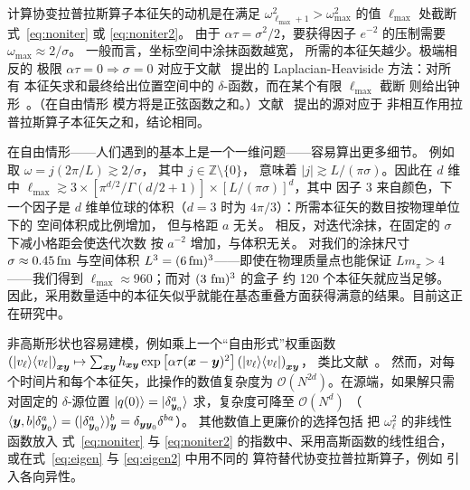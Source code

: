 计算协变拉普拉斯算子本征矢的动机是在满足 $\omega_{\ell_{\max}+1}^2>\omega_{\max}^2$ 的值 $\ell_{\max}$ 处截断
式~\eqref{eq:noniter} 或 \eqref{eq:noniter2}。
由于 $\alpha\tau=\sigma^2/2$，要获得因子 $e^{-2}$ 的压制需要
$\omega_{\max}\approx 2/\sigma$。
一般而言，坐标空间中涂抹函数越宽，
所需的本征矢越少。极端相反的
极限 $\alpha\tau=0\Rightarrow\sigma=0$ 对应于文献~\cite{Peardon:2009gh} 提出的
Laplacian-Heaviside 方法：对所有
本征矢求和最终给出位置空间中的 $\delta$-函数，而在某个有限 $\ell_{\max}$ 截断
则给出钟形~\cite{Peardon:2009gh}。（在自由情形
模方将是正弦函数之和。）文献~\cite{Brown:2012tm} 提出的源对应于
非相互作用拉普拉斯算子本征矢之和，结论相同。

在自由情形——人们遇到的基本上是一个一维问题——容易算出更多细节。
例如取 $\omega= j (2\pi/L)\gtrsim 2/\sigma$，
其中 $j\in\mathbb{Z}\setminus\{0\}$，
意味着
$|j|\gtrsim L/(\pi\sigma)$。因此在 $d$ 维中
$\ell_{\max}\gtrsim 3\times[\pi^{d/2}/\Gamma(d/2+1)]\times[L/(\pi\sigma)]^d$，其中
因子 $3$ 来自颜色，下一个因子是
$d$ 维单位球的体积（$d=3$ 时为 $4\pi/3$）：所需本征矢的数目按物理单位下的
空间体积成比例增加，
但与格距 $a$ 无关。
相反，对迭代涂抹，在固定的 $\sigma$ 下减小格距会使迭代次数
按 $a^{-2}$ 增加，与体积无关。
对我们的涂抹尺寸 $\sigma\approx0.45\,\textmd{fm}$ 与空间体积
$L^3=(6\,\textmd{fm})^3$——即使在物理质量点也能保证 $Lm_{\pi}>4$——我们得到
$\ell_{\max}\approx 960$；而对 $(3\,\,\textmd{fm})^3$ 的盒子
约 120 个本征矢就应当足够。
因此，采用数量适中的本征矢似乎就能在基态重叠方面获得满意的结果。目前这正在研究中。

非高斯形状也容易建模，例如乘上一个``自由形式''权重函数
$\left(|v_{\ell}\rangle\langle v_{\ell}|\right)_{\boldsymbol{x}\boldsymbol{y}}
\mapsto \sum_{\boldsymbol{xy}}h_{\boldsymbol{x}\boldsymbol{y}}\exp\left[\alpha\tau(\boldsymbol{x}-\boldsymbol{y})^2\right]\left(|v_{\ell}\rangle\langle v_{\ell}|\right)_{\boldsymbol{x}\boldsymbol{y}}$，
类比文献~\cite{vonHippel:2013yfa}。
然而，对每个时间片和每个本征矢，此操作的数值复杂度为
$\mathcal{O}(N^{2d})$。在源端，如果解只需对固定的 $\delta$-源位置
$|q(0)\rangle=|\delta_{\boldsymbol{y}_0}^a\rangle$ 求，复杂度可降至 $\mathcal{O}(N^{d})$
（$\langle\boldsymbol{y},b|\delta_{\boldsymbol{y}_0}^a\rangle=(|\delta_{\boldsymbol{y}_0}^a\rangle)_{\boldsymbol{y}}^b=\delta_{\boldsymbol{y}\boldsymbol{y}_0}\delta^{ba}$）。
其他数值上更廉价的选择包括
把 $\omega^2_{\ell}$ 的非线性函数放入
式~\eqref{eq:noniter} 与 \eqref{eq:noniter2} 的指数中、采用高斯函数的线性组合，或在式~\eqref{eq:eigen} 与 \eqref{eq:eigen2} 中用不同的
算符替代协变拉普拉斯算子，例如
引入各向异性。

